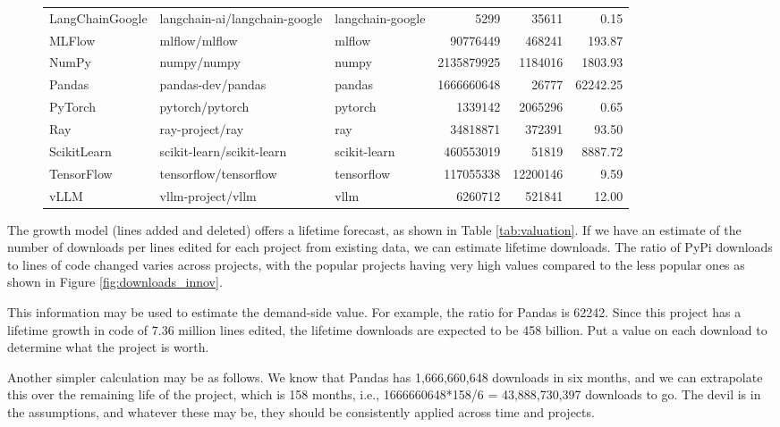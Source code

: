 \documentclass[conference]{IEEEtran}
\begin{document}
\begin{figure}
{\begin{tabular}{lllrrr}
LangChainGoogle &  langchain-ai/langchain-google &  langchain-google & 5299 & 35611 & 0.15 \\
MLFlow &  mlflow/mlflow &  mlflow & 90776449 & 468241 & 193.87 \\
NumPy &  numpy/numpy &  numpy & 2135879925 & 1184016 & 1803.93 \\
Pandas &  pandas-dev/pandas &  pandas & 1666660648 & 26777 & 62242.25 \\
PyTorch &  pytorch/pytorch &  pytorch & 1339142 & 2065296 & 0.65 \\
Ray &  ray-project/ray &  ray & 34818871 & 372391 & 93.50 \\
ScikitLearn &  scikit-learn/scikit-learn &  scikit-learn & 460553019 & 51819 & 8887.72 \\
TensorFlow &  tensorflow/tensorflow &  tensorflow & 117055338 & 12200146 & 9.59 \\
vLLM &  vllm-project/vllm &  vllm & 6260712 & 521841 & 12.00 \\
\bottomrule
\end{tabular}
}
\end{figure}

The growth model (lines added and deleted) offers a lifetime forecast, as shown in Table \ref{tab:valuation}. If we have an estimate of the number of downloads per lines edited for each project from existing data, we can estimate lifetime downloads. The ratio of PyPi downloads to lines of code changed varies across projects, with the popular projects having very high values compared to the less popular ones as shown in Figure \ref{fig:downloads_innov}. 

This information may be used to estimate the demand-side value. For example, the ratio for Pandas is 62242. Since this project has a lifetime growth in code of 7.36 million lines edited, the lifetime downloads are expected to be 458 billion. Put a value on each download to determine what the project is worth. 

Another simpler calculation may be as follows. We know that Pandas has 1,666,660,648 downloads in six months, and we can extrapolate this over the remaining life of the project, which is 158 months, i.e., 1666660648*158/6 = 43,888,730,397 downloads to go. The devil is in the assumptions, and whatever these may be, they should be consistently applied across time and projects. 
\end{document}
